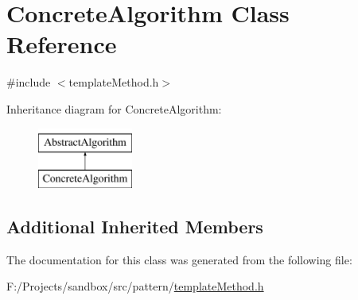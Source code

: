 \hypertarget{class_concrete_algorithm}{\section{Concrete\-Algorithm Class Reference}
\label{class_concrete_algorithm}
}


{\ttfamily \#include $<$template\-Method.\-h$>$}

Inheritance diagram for Concrete\-Algorithm\-:\begin{figure}[H]
\begin{center}
\leavevmode
\includegraphics[height=2.000000cm]{class_concrete_algorithm}
\end{center}
\end{figure}
\subsection*{Additional Inherited Members}


The documentation for this class was generated from the following file\-:\begin{DoxyCompactItemize}
\item 
F\-:/\-Projects/sandbox/src/pattern/\hyperlink{template_method_8h}{template\-Method.\-h}\end{DoxyCompactItemize}
